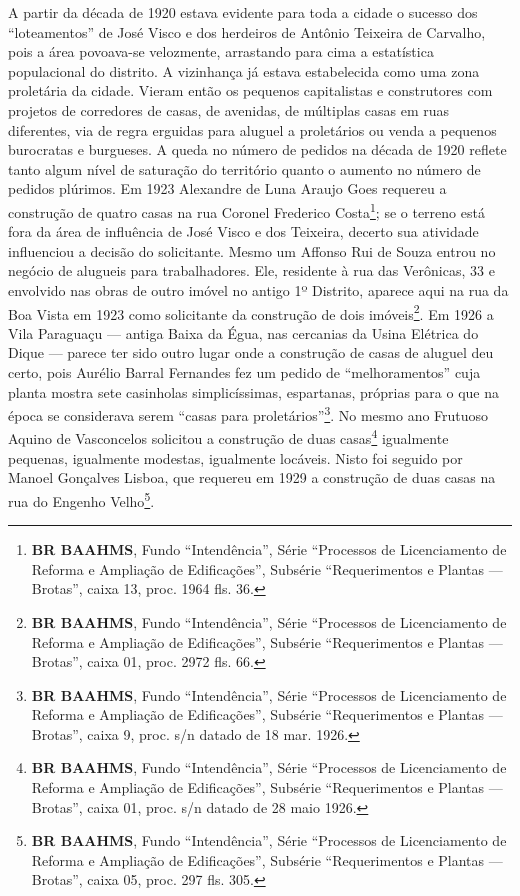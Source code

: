A partir da década de 1920 estava evidente para toda a cidade o sucesso dos ``loteamentos'' de José Visco e dos herdeiros de Antônio Teixeira de Carvalho, pois a área povoava-se velozmente, arrastando para cima a estatística populacional do distrito. A vizinhança já estava estabelecida como uma zona proletária da cidade. Vieram então os pequenos capitalistas e construtores com projetos de corredores de casas, de avenidas, de múltiplas casas em ruas diferentes, via de regra erguidas para aluguel a proletários ou venda a pequenos burocratas e burgueses. A queda no número de pedidos na década de 1920 reflete tanto algum nível de saturação do território quanto o aumento no número de pedidos plúrimos. Em 1923 Alexandre de Luna Araujo Goes requereu a construção de quatro casas na rua Coronel Frederico Costa\footnote{\textbf{BR BAAHMS}, Fundo ``Intendência'', Série ``Processos de Licenciamento de Reforma e Ampliação de Edificações'', Subsérie ``Requerimentos e Plantas --- Brotas'', caixa 13, proc. 1964 fls. 36.}; se o terreno está fora da área de influência de José Visco e dos Teixeira, decerto sua atividade influenciou a decisão do solicitante. Mesmo um Affonso Rui de Souza entrou no negócio de alugueis para trabalhadores. Ele, residente à rua das Verônicas, 33 e envolvido nas obras de outro imóvel no antigo 1º Distrito, aparece aqui na rua da Boa Vista em 1923 como solicitante da construção de dois imóveis\footnote{\textbf{BR BAAHMS}, Fundo ``Intendência'', Série ``Processos de Licenciamento de Reforma e Ampliação de Edificações'', Subsérie ``Requerimentos e Plantas --- Brotas'', caixa 01, proc. 2972 fls. 66.}. Em 1926 a Vila Paraguaçu --- antiga Baixa da Égua, nas cercanias da Usina Elétrica do Dique \cite[p.~104]{souza_guia_1935} --- parece ter sido outro lugar onde a construção de casas de aluguel deu certo, pois Aurélio Barral Fernandes fez um pedido de ``melhoramentos'' cuja planta mostra sete casinholas simplicíssimas, espartanas, próprias para o que na época se considerava serem ``casas para proletários''\footnote{\textbf{BR BAAHMS}, Fundo ``Intendência'', Série ``Processos de Licenciamento de Reforma e Ampliação de Edificações'', Subsérie ``Requerimentos e Plantas --- Brotas'', caixa 9, proc. s/n datado de 18 mar. 1926.}. No mesmo ano Frutuoso Aquino de Vasconcelos solicitou a construção de duas casas\footnote{\textbf{BR BAAHMS}, Fundo ``Intendência'', Série ``Processos de Licenciamento de Reforma e Ampliação de Edificações'', Subsérie ``Requerimentos e Plantas --- Brotas'', caixa 01, proc. s/n datado de 28 maio 1926.} igualmente pequenas, igualmente modestas, igualmente locáveis. Nisto foi seguido por Manoel Gonçalves Lisboa, que requereu em 1929 a construção de duas casas na rua do Engenho Velho\footnote{\textbf{BR BAAHMS}, Fundo ``Intendência'', Série ``Processos de Licenciamento de Reforma e Ampliação de Edificações'', Subsérie ``Requerimentos e Plantas --- Brotas'', caixa 05, proc. 297 fls. 305.}.


